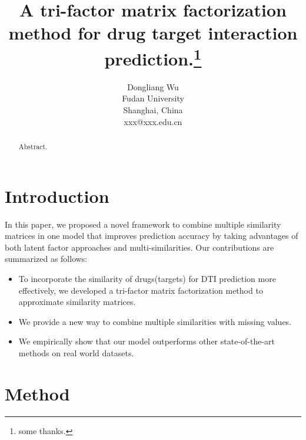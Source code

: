 \documentclass{article}
\title{ A tri-factor matrix factorization method for drug target interaction prediction.\thanks{ some thanks.}}
\author{Dongliang Wu \\
Fudan University\\
Shanghai, China \\
xxx@xxx.edu.cn}
\begin{document}
\maketitle

\begin{abstract}
  Abstract.
\end{abstract}

\section{Introduction}
\indent In this paper, we proposed a novel framework to combine multiple similarity matrices in one model that improves prediction accuracy by taking advantages of both latent factor approaches and multi-similarities. Our contributions are summarized as follows:
\begin{itemize}
\item To incorporate the similarity of drugs(targets) for DTI prediction more effectively, we developed a tri-factor matrix factorization method to approximate similarity matrices. 
\item We provide a new way to combine multiple similarities with missing values.
\item We empirically show that our model outperforms other state-of-the-art methods on real world datasets.
\end{itemize}

\section{Method}
\end{document}
